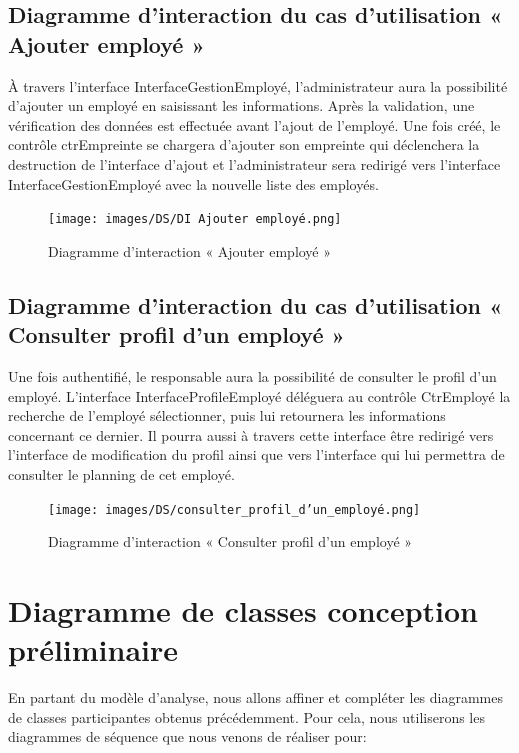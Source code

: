 \subsection*{Diagramme d'interaction du cas d'utilisation « Ajouter employé »}
À travers l’interface InterfaceGestionEmployé, l’administrateur aura la
possibilité d’ajouter un employé en saisissant les informations. Après la
validation, une vérification des données est effectuée avant l’ajout de
l’employé. Une fois créé, le contrôle ctrEmpreinte se chargera d’ajouter son
empreinte qui déclenchera la destruction de l’interface d’ajout et
l’administrateur sera redirigé vers l’interface InterfaceGestionEmployé avec la
nouvelle liste des employés.

\clearpage

\begin{figure}[h!]
    \centering
    \texttt{[image: images/DS/DI Ajouter employé.png]}
    \caption{Diagramme d'interaction « Ajouter employé »}
    \label{fig41}
\end{figure}

\subsection*{Diagramme d'interaction du cas d'utilisation « Consulter profil d'un employé »}
Une fois authentifié, le responsable aura la possibilité de consulter le profil
d’un employé. L’interface InterfaceProfileEmployé déléguera au contrôle
CtrEmployé la recherche de l’employé sélectionner, puis lui retournera les
informations concernant ce dernier. Il pourra aussi à travers cette interface
être redirigé vers l’interface de modification du profil ainsi que vers
l’interface qui lui permettra de consulter le planning de cet employé.
        
\clearpage
        
\begin{figure}[h!]
    \centering
    \texttt{[image: images/DS/consulter\_profil\_d'un\_employé.png]}
    \caption{Diagramme d'interaction « Consulter profil d'un employé »}
    \label{fig42}
\end{figure}
    
\section{Diagramme de classes conception préliminaire}
En partant du modèle d’analyse, nous allons affiner et compléter les diagrammes 
de classes participantes obtenus précédemment. Pour cela, nous utiliserons les 
diagrammes de séquence que nous venons de réaliser pour:

